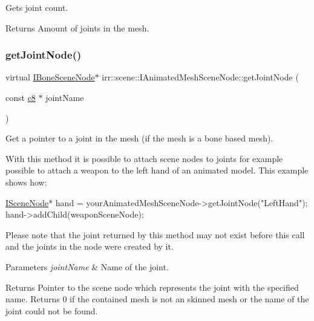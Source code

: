 Gets joint count. 

\begin{DoxyReturn}{Returns}
Amount of joints in the mesh. 
\end{DoxyReturn}
\mbox{\label{classirr_1_1scene_1_1IAnimatedMeshSceneNode_ac7b64a5ddbe5d570dc5276b894a63619}} 
\subsubsection{\texorpdfstring{get\+Joint\+Node()}{getJointNode()}}
{\footnotesize\ttfamily virtual \hyperlink{classirr_1_1scene_1_1IBoneSceneNode}{I\+Bone\+Scene\+Node}$\ast$ irr\+::scene\+::\+I\+Animated\+Mesh\+Scene\+Node\+::get\+Joint\+Node (\begin{DoxyParamCaption}\item[{const \hyperlink{namespaceirr_a9395eaea339bcb546b319e9c96bf7410}{c8} $\ast$}]{joint\+Name }\end{DoxyParamCaption})\hspace{0.3cm}{\ttfamily [pure virtual]}}



Get a pointer to a joint in the mesh (if the mesh is a bone based mesh). 

With this method it is possible to attach scene nodes to joints for example possible to attach a weapon to the left hand of an animated model. This example shows how\+: 
\begin{DoxyCode}
\hyperlink{classirr_1_1scene_1_1ISceneNode_a9894d951df2f720924f891e0a7b9fac2}{ISceneNode}* hand =
    yourAnimatedMeshSceneNode->getJointNode(\textcolor{stringliteral}{"LeftHand"});
hand->addChild(weaponSceneNode);
\end{DoxyCode}
 Please note that the joint returned by this method may not exist before this call and the joints in the node were created by it. 
\begin{DoxyParams}{Parameters}
{\em joint\+Name} & Name of the joint. \\
\hline
\end{DoxyParams}
\begin{DoxyReturn}{Returns}
Pointer to the scene node which represents the joint with the specified name. Returns 0 if the contained mesh is not an skinned mesh or the name of the joint could not be found. 
\end{DoxyReturn}
\mbox{\label{classirr_1_1scene_1_1IAnimatedMeshSceneNode_a3271dc33b1911d637b05c58f17398a0a}} 
